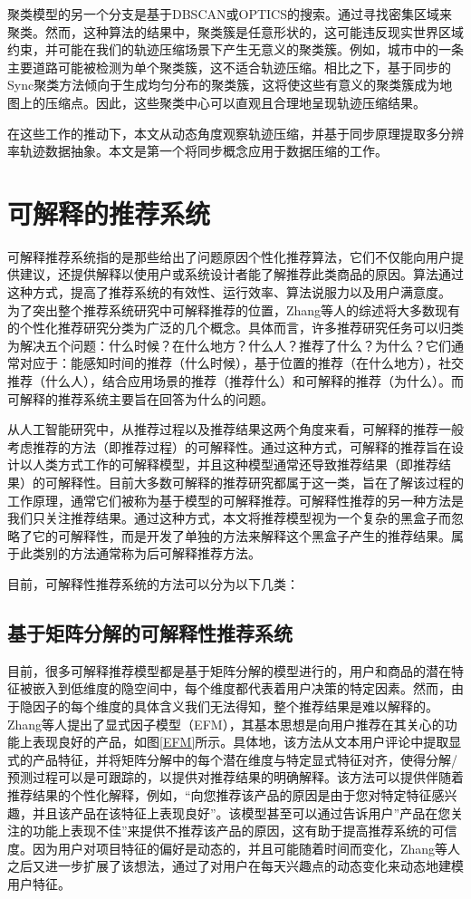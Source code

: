 聚类模型的另一个分支是基于DBSCAN\cite{ester1996density}或OPTICS\cite{ankerst1999optics}的搜索。通过寻找密集区域来聚类。然而，这种算法的结果中，聚类簇是任意形状的，这可能违反现实世界区域约束，并可能在我们的轨迹压缩场景下产生无意义的聚类簇。例如，城市中的一条主要道路可能被检测为单个聚类簇，这不适合轨迹压缩。相比之下，基于同步的Sync聚类方法倾向于生成均匀分布的聚类簇，这将使这些有意义的聚类簇成为地图上的压缩点。因此，这些聚类中心可以直观且合理地呈现轨迹压缩结果。


在这些工作的推动下，本文从动态角度观察轨迹压缩，并基于同步原理提取多分辨率轨迹数据抽象。本文是第一个将同步概念应用于数据压缩的工作。

\section{可解释的推荐系统}
可解释推荐系统指的是那些给出了问题原因个性化推荐算法，它们不仅能向用户提供建议，还提供解释以使用户或系统设计者能了解推荐此类商品的原因。算法通过这种方式，提高了推荐系统的有效性、运行效率、算法说服力以及用户满意度。
为了突出整个推荐系统研究中可解释推荐的位置，Zhang等人的综述\cite{zhang2018explainable}将大多数现有的个性化推荐研究分类为广泛的几个概念。具体而言，许多推荐研究任务可以归类为解决五个问题：什么时候？在什么地方？什么人？推荐了什么？为什么？它们通常对应于：能感知时间的推荐（什么时候），基于位置的推荐（在什么地方），社交推荐（什么人），结合应用场景的推荐（推荐什么）和可解释的推荐（为什么）。而可解释的推荐系统主要旨在回答为什么的问题。

从人工智能研究中，从推荐过程以及推荐结果这两个角度来看，可解释的推荐一般考虑推荐的方法（即推荐过程）的可解释性。通过这种方式，可解释的推荐旨在设计以人类方式工作的可解释模型，并且这种模型通常还导致推荐结果（即推荐结果）的可解释性。目前大多数可解释的推荐研究都属于这一类，旨在了解该过程的工作原理，通常它们被称为基于模型的可解释推荐。可解释性推荐的另一种方法是我们只关注推荐结果。通过这种方式，本文将推荐模型视为一个复杂的黑盒子而忽略了它的可解释性，而是开发了单独的方法来解释这个黑盒子产生的推荐结果。属于此类别的方法通常称为后可解释推荐方法。

目前，可解释性推荐系统的方法可以分为以下几类：

\subsection{基于矩阵分解的可解释性推荐系统}
目前，很多可解释推荐模型都是基于矩阵分解的模型进行的，用户和商品的潜在特征被嵌入到低维度的隐空间中，每个维度都代表着用户决策的特定因素。然而，由于隐因子的每个维度的具体含义我们无法得知，整个推荐结果是难以解释的。Zhang等人\cite{zhang2014explicit}提出了显式因子模型（EFM），其基本思想是向用户推荐在其关心的功能上表现良好的产品，如图\ref{EFM}所示。具体地，该方法从文本用户评论中提取显式的产品特征，并将矩阵分解中的每个潜在维度与特定显式特征对齐，使得分解/预测过程可以是可跟踪的，以提供对推荐结果的明确解释。该方法可以提供伴随着推荐结果的个性化解释，例如，“向您推荐该产品的原因是由于您对特定特征感兴趣，并且该产品在该特征上表现良好”。该模型甚至可以通过告诉用户”产品在您关注的功能上表现不佳”来提供不推荐该产品的原因，这有助于提高推荐系统的可信度。因为用户对项目特征的偏好是动态的，并且可能随着时间而变化，Zhang等人\cite{zhang2015daily}之后又进一步扩展了该想法，通过了对用户在每天兴趣点的动态变化来动态地建模用户特征。

